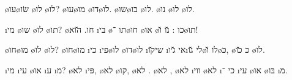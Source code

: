 
\begin{twocol}
\begin{stanza}
 \o{עו}\o{שׂו} \o{לו} \o{לו}?
 \o{עו}\o{מו}   \o{דו}\o{לו}.
 \o{שו}\o{בו}   \o{לו}.
\o{נו} \o{לו} \o{לו}.
\end{stanza}

\begin{stanza}
\i{מי} \o{שו}  \o{לו} \o{תו}?
  \o{חו}.
\u{הוא} \i{בּי} \o{תו}  ־\o{חו}
\o{או} \o{כו} : \u{נו} \u{ו}\o{תו}!
\end{stanza}

\begin{stanza}
 \o{חו}\o{מו} \o{לו} \o{לו}?
 \o{חו}\o{מו} \i{כי} \i{פי}\o{לו} \o{דו}\o{לו}
\i{שי}\u{קו} \i{אי} \u{ג׳ו}\i{לי} \u{גו}\o{לו}
\u{ו}\o{כּ}, \o{כּ} \u{כו} \o{לו}.
\end{stanza}

\begin{stanza}
\i{מי} \i{עי} \o{או} \i{ע}  \i{מ}?
\o{לא} \i{פּי}, \o{לא} \o{קו}, \o{לא} .
\o{לא} , \o{לא} \i{ווי} \o{לא} 
\i{כי} ־ 
\i{עי} \o{או} \o{בּו} \i{מ}.
\end{stanza}
\end{twocol}
